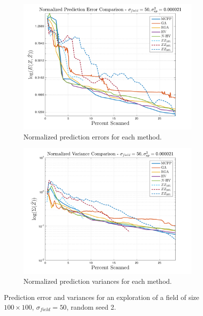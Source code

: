 \begin{figure}[htb!]
    \centering
    \begin{subfigure}[t]{0.5\textwidth}
        \centering
        \includegraphics[width=\linewidth]{figures/results/normalized_errors_30p_100x100_sf_50_seed_2_app_50.png}
        \ssp
        \captionsetup{skip=0.20\baselineskip,size=footnotesize}
        \caption{Normalized prediction errors for each method.}
    \end{subfigure}%
    \begin{subfigure}[t]{0.5\textwidth}
        \centering
        \includegraphics[width=\linewidth]{figures/results/normalized_variances_30p_100x100_sf_50_seed_2_app_50.png}
        \ssp
        \captionsetup{skip=0.20\baselineskip,size=footnotesize}
        \caption{Normalized prediction variances for each method.}
    \end{subfigure}%
    \ssp
    \captionsetup{skip=0.20\baselineskip}
    \caption{Prediction error and variances for an exploration of a field of size $100 \times 100$, $\sigma_{field} = 50$, random seed 2.}
    \label{fig:errvar50}
\end{figure}

